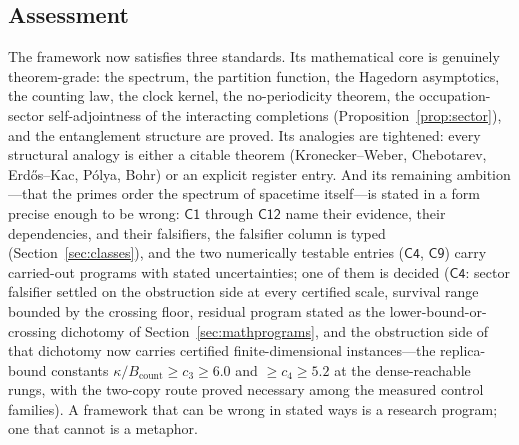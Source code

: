 \subsection{Assessment}

The framework now satisfies three standards. Its mathematical core is genuinely theorem-grade: the
spectrum, the
partition function, the Hagedorn asymptotics, the counting law, the clock kernel, the
no-periodicity theorem, the occupation-sector self-adjointness of the interacting
completions (Proposition~\ref{prop:sector}), and the entanglement structure are proved. Its
analogies are
tightened: every structural analogy is either
a citable theorem (Kronecker--Weber, Chebotarev, Erd\H{o}s--Kac, P\'olya,
Bohr) or an explicit register entry. And its remaining ambition---that the primes order the
spectrum of spacetime itself---is stated in a form precise enough to be wrong:
$\mathsf{C1}$ through $\mathsf{C12}$ name their evidence, their dependencies, and their
falsifiers, the falsifier column is typed (Section~\ref{sec:classes}), and the two
numerically testable entries ($\mathsf{C4}$, $\mathsf{C9}$) carry
carried-out programs with stated uncertainties; one of them is decided
($\mathsf{C4}$: sector falsifier settled on the obstruction side at every certified
scale, survival range bounded by the crossing floor, residual program stated as the
lower-bound-or-crossing dichotomy of Section~\ref{sec:mathprograms}, and the
obstruction side of that dichotomy now carries certified finite-dimensional
instances---the replica-bound constants
$\kappa/B_{\mathrm{count}}\ge c_{3}\ge6.0$ and $\ge c_{4}\ge5.2$ at the
dense-reachable rungs, with the two-copy route proved necessary among the
measured control families). A framework that can be wrong in stated
ways is a research program; one that
cannot is a metaphor.

